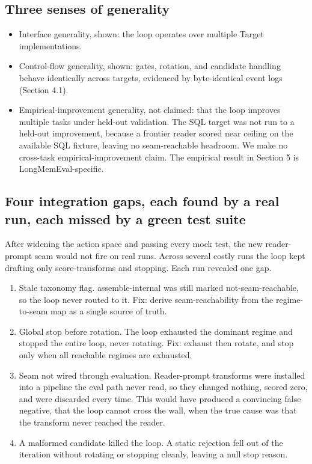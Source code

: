 \subsection{Three senses of generality}

\begin{itemize}
\item Interface generality, shown: the loop operates over multiple Target implementations.
\item Control-flow generality, shown: gates, rotation, and candidate handling behave identically across targets, evidenced by byte-identical event logs (Section 4.1).
\item Empirical-improvement generality, not claimed: that the loop improves multiple tasks under held-out validation. The SQL target was not run to a held-out improvement, because a frontier reader scored near ceiling on the available SQL fixture, leaving no seam-reachable headroom. We make no cross-task empirical-improvement claim. The empirical result in Section 5 is LongMemEval-specific.
\end{itemize}

\subsection{Four integration gaps, each found by a real run, each missed by a green test suite}

After widening the action space and passing every mock test, the new reader-prompt seam would not fire on real runs. Across several costly runs the loop kept drafting only score-transforms and stopping. Each run revealed one gap.

\begin{enumerate}
\item Stale taxonomy flag. assemble-internal was still marked not-seam-reachable, so the loop never routed to it. Fix: derive seam-reachability from the regime-to-seam map as a single source of truth.
\item Global stop before rotation. The loop exhausted the dominant regime and stopped the entire loop, never rotating. Fix: exhaust then rotate, and stop only when all reachable regimes are exhausted.
\item Seam not wired through evaluation. Reader-prompt transforms were installed into a pipeline the eval path never read, so they changed nothing, scored zero, and were discarded every time. This would have produced a convincing false negative, that the loop cannot cross the wall, when the true cause was that the transform never reached the reader.
\item A malformed candidate killed the loop. A static rejection fell out of the iteration without rotating or stopping cleanly, leaving a null stop reason.
\end{enumerate}


